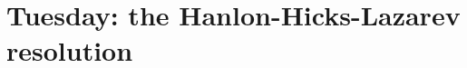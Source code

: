 \documentclass[11pt]{amsart}
\numberwithin{equation}{section}
\theoremstyle{definition}
\theoremstyle{remark}
\begin{document}
\section*{Tuesday: the Hanlon-Hicks-Lazarev resolution}






%
\end{document}

